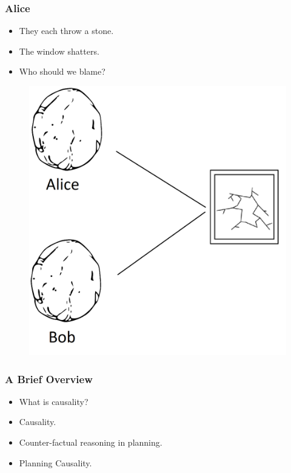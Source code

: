 \documentclass{beamer}
\theoremstyle{plain}
\theoremstyle{definition}
\begin{document}
\begin{frame}
\frametitle{Alice}
\begin{itemize}
\item They each throw a stone.
\item The window shatters.
\item Who should we blame?
\end{itemize}

\begin{figure}
\includegraphics[scale=0.15]{stoneWindow}
\end{figure}

\end{frame}


\begin{frame}
\frametitle{A Brief Overview}
\begin{itemize}
\item What is causality?
\item \citet{halpern2005causes} Causality.
\item Counter-factual reasoning in planning.
\item Planning Causality.
\end{itemize}

\end{frame}
\end{document}
